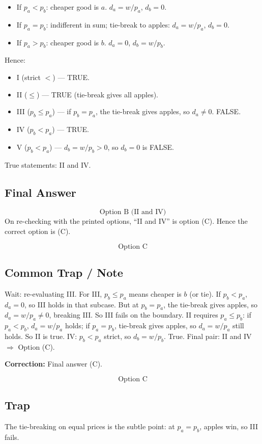\documentclass[11pt]{article}
\begin{document}
\begin{itemize}[leftmargin=*]
\item If $p_a < p_b$: cheaper good is $a$. $d_a = w/p_a$, $d_b = 0$.
\item If $p_a = p_b$: indifferent in sum; tie-break to apples: $d_a = w/p_a$, $d_b = 0$.
\item If $p_a > p_b$: cheaper good is $b$. $d_a = 0$, $d_b = w/p_b$.
\end{itemize}
Hence:
\begin{itemize}[leftmargin=*]
\item I (strict $<$) --- TRUE.
\item II ($\le$) --- TRUE (tie-break gives all apples).
\item III ($p_b \le p_a$) --- if $p_b = p_a$, the tie-break gives apples, so $d_a \ne 0$. FALSE.
\item IV ($p_b < p_a$) --- TRUE.
\item V ($p_b < p_a$) --- $d_b = w/p_b > 0$, so $d_b = 0$ is FALSE.
\end{itemize}
True statements: II and IV.

\subsection*{Final Answer}
\[
\boxed{\text{Option B (II and IV)}}
\]
On re-checking with the printed options, ``II and IV'' is option (C). Hence the correct option is (C).

\[
\boxed{\text{Option C}}
\]

\subsection*{Common Trap / Note}
Wait: re-evaluating III. For III, $p_b \le p_a$ means cheaper is $b$ (or tie). If $p_b < p_a$, $d_a = 0$, so III holds in that subcase. But at $p_b = p_a$, the tie-break gives apples, so $d_a = w/p_a \ne 0$, breaking III. So III fails on the boundary. II requires $p_a \le p_b$: if $p_a < p_b$, $d_a = w/p_a$ holds; if $p_a = p_b$, tie-break gives apples, so $d_a = w/p_a$ still holds. So II is true. IV: $p_b < p_a$ strict, so $d_b = w/p_b$. True. Final pair: II and IV $\Rightarrow$ Option (C).

\textbf{Correction:} Final answer (C).

\[
\boxed{\text{Option C}}
\]

\subsection*{Trap}
The tie-breaking on equal prices is the subtle point: at $p_a = p_b$, apples win, so III fails.
\end{document}

